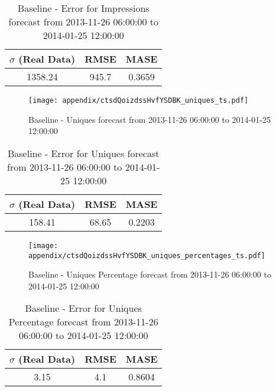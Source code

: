 \begin{table}[H]
\centering
\footnotesize
\begin{tabular}{ccc}
$\sigma$ (Real Data) & RMSE & MASE   \\ \hline
1358.24 & 945.7 & 0.3659 \\
\end{tabular}

\vspace{0.5cm}

\caption{
Baseline - Error for Impressions forecast from 2013-11-26 06:00:00 to 2014-01-25 12:00:00}
\end{table}

\begin{figure}[H] \begin{center} \leavevmode
\texttt{[image: appendix/ctsdQoizdssHvfYSDBK\_uniques\_ts.pdf]} \caption{
Baseline - Uniques forecast from 2013-11-26 06:00:00 to 2014-01-25 12:00:00} \label{fig:appendix/ctsdQoizdssHvfYSDBK_uniques_ts.pdf} \end{center}
\end{figure}

\begin{table}[H]
\centering
\footnotesize
\begin{tabular}{ccc}
$\sigma$ (Real Data) & RMSE & MASE   \\ \hline
158.41 & 68.65 & 0.2203 \\
\end{tabular}

\vspace{0.5cm}

\caption{
Baseline - Error for Uniques forecast from 2013-11-26 06:00:00 to 2014-01-25 12:00:00}
\end{table}

\begin{figure}[H] \begin{center} \leavevmode
\texttt{[image: appendix/ctsdQoizdssHvfYSDBK\_uniques\_percentages\_ts.pdf]} \caption{
Baseline - Uniques Percentage forecast from 2013-11-26 06:00:00 to 2014-01-25 12:00:00} \label{fig:appendix/ctsdQoizdssHvfYSDBK_uniques_percentages_ts.pdf} \end{center}
\end{figure}

\begin{table}[H]
\centering
\footnotesize
\begin{tabular}{ccc}
$\sigma$ (Real Data) & RMSE & MASE   \\ \hline
3.15 & 4.1 & 0.8604 \\
\end{tabular}

\vspace{0.5cm}

\caption{
Baseline - Error for Uniques Percentage forecast from 2013-11-26 06:00:00 to 2014-01-25 12:00:00}
\end{table}

